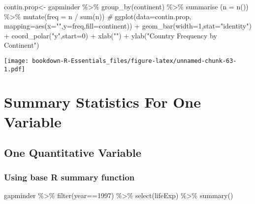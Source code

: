 \documentclass[
]{book}
\newenvironment{Shaded}{\begin{snugshade}}{\end{snugshade}}
\newcommand{\AttributeTok}[1]{\textcolor[rgb]{0.77,0.63,0.00}{#1}}
\newcommand{\CommentTok}[1]{\textcolor[rgb]{0.56,0.35,0.01}{\textit{#1}}}
\newcommand{\DecValTok}[1]{\textcolor[rgb]{0.00,0.00,0.81}{#1}}
\newcommand{\FunctionTok}[1]{\textcolor[rgb]{0.00,0.00,0.00}{#1}}
\newcommand{\NormalTok}[1]{#1}
\newcommand{\OtherTok}[1]{\textcolor[rgb]{0.56,0.35,0.01}{#1}}
\newcommand{\SpecialCharTok}[1]{\textcolor[rgb]{0.00,0.00,0.00}{#1}}
\newcommand{\StringTok}[1]{\textcolor[rgb]{0.31,0.60,0.02}{#1}}
\begin{document}
\begin{Shaded}
\begin{Highlighting}[]
\NormalTok{contin.prop}\OtherTok{\textless{}{-}}\NormalTok{ gapminder }\SpecialCharTok{\%\textgreater{}\%} 
  \FunctionTok{group\_by}\NormalTok{(continent) }\SpecialCharTok{\%\textgreater{}\%}
  \FunctionTok{summarise}\NormalTok{ (}\AttributeTok{n =} \FunctionTok{n}\NormalTok{()) }\SpecialCharTok{\%\textgreater{}\%}
  \FunctionTok{mutate}\NormalTok{(}\AttributeTok{freq =}\NormalTok{ n }\SpecialCharTok{/} \FunctionTok{sum}\NormalTok{(n))}
\CommentTok{\#}
\FunctionTok{ggplot}\NormalTok{(}\AttributeTok{data=}\NormalTok{contin.prop, }\AttributeTok{mapping=}\FunctionTok{aes}\NormalTok{(}\AttributeTok{x=}\StringTok{""}\NormalTok{,}\AttributeTok{y=}\NormalTok{freq,}\AttributeTok{fill=}\NormalTok{continent)) }\SpecialCharTok{+} 
  \FunctionTok{geom\_bar}\NormalTok{(}\AttributeTok{width=}\DecValTok{1}\NormalTok{,}\AttributeTok{stat=}\StringTok{"identity"}\NormalTok{) }\SpecialCharTok{+}
  \FunctionTok{coord\_polar}\NormalTok{(}\StringTok{"y"}\NormalTok{,}\AttributeTok{start=}\DecValTok{0}\NormalTok{) }\SpecialCharTok{+}
  \FunctionTok{xlab}\NormalTok{(}\StringTok{""}\NormalTok{) }\SpecialCharTok{+} \FunctionTok{ylab}\NormalTok{(}\StringTok{"Country Frequency by Continent"}\NormalTok{)}
\end{Highlighting}
\end{Shaded}

\texttt{[image: bookdown-R-Essentials\_files/figure-latex/unnamed-chunk-63-1.pdf]}

\hypertarget{summary-statistics-for-one-variable}{%
\chapter{Summary Statistics For One Variable}\label{summary-statistics-for-one-variable}}

\hypertarget{one-quantitative-variable}{%
\section{One Quantitative Variable}\label{one-quantitative-variable}}

\hypertarget{using-base-r-summary-function}{%
\subsection{Using base R summary function}\label{using-base-r-summary-function}}

\begin{Shaded}
\begin{Highlighting}[]
\NormalTok{gapminder }\SpecialCharTok{\%\textgreater{}\%} \FunctionTok{filter}\NormalTok{(year}\SpecialCharTok{==}\DecValTok{1997}\NormalTok{) }\SpecialCharTok{\%\textgreater{}\%} \FunctionTok{select}\NormalTok{(lifeExp) }\SpecialCharTok{\%\textgreater{}\%} \FunctionTok{summary}\NormalTok{()}
\end{Highlighting}
\end{Shaded}
\end{document}

